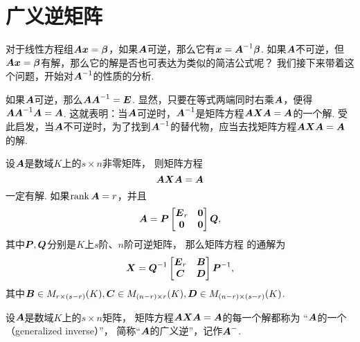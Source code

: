 \section{广义逆矩阵}
对于线性方程组\(\boldsymbol{A}\boldsymbol{x}=\boldsymbol\beta\)，如果\(\boldsymbol{A}\)可逆，那么它有\(\boldsymbol{x}=\boldsymbol{A}^{-1}\boldsymbol\beta\).
如果\(\boldsymbol{A}\)不可逆，但\(\boldsymbol{A}\boldsymbol{x}=\boldsymbol\beta\)有解，那么它的解是否也可表达为类似的简洁公式呢？
我们接下来带着这个问题，开始对\(\boldsymbol{A}^{-1}\)的性质的分析.

如果\(\boldsymbol{A}\)可逆，那么\(\boldsymbol{A}\boldsymbol{A}^{-1}=\boldsymbol{E}\).
显然，只要在等式两端同时右乘\(\boldsymbol{A}\)，便得\(\boldsymbol{A}\boldsymbol{A}^{-1}\boldsymbol{A}=\boldsymbol{A}\).
这就表明：当\(\boldsymbol{A}\)可逆时，\(\boldsymbol{A}^{-1}\)是矩阵方程\(\boldsymbol{A} \boldsymbol{X} \boldsymbol{A} = \boldsymbol{A}\)的一个解.
受此启发，当\(\boldsymbol{A}\)不可逆时，为了找到\(\boldsymbol{A}^{-1}\)的替代物，应当去找矩阵方程\(\boldsymbol{A} \boldsymbol{X} \boldsymbol{A} = \boldsymbol{A}\)的解.

\begin{theorem}[广义逆存在定理]\label{theorem:线性方程组.广义逆1}
设\(\boldsymbol{A}\)是数域\(K\)上的\(s \times n\)非零矩阵，
则矩阵方程\begin{equation}\label{equation:线性方程组.广义逆1矩阵方程}
	\boldsymbol{A} \boldsymbol{X} \boldsymbol{A} = \boldsymbol{A}
\end{equation}一定有解.
如果\(\rank\boldsymbol{A}=r\)，并且\begin{equation*}
	\boldsymbol{A}
	= \boldsymbol{P}
	\begin{bmatrix}
		\boldsymbol{E}_r & \boldsymbol0 \\
		\boldsymbol0 & \boldsymbol0
	\end{bmatrix}
	\boldsymbol{Q},
\end{equation*}
其中\(\boldsymbol{P},\boldsymbol{Q}\)分别是\(K\)上\(s\)阶、\(n\)阶可逆矩阵，
那么矩阵方程  的通解为
\begin{equation}\label{equation:线性方程组.广义逆1矩阵方程的通解}
	\boldsymbol{X} = \boldsymbol{Q}^{-1} \begin{bmatrix} \boldsymbol{E}_r & \boldsymbol{B} \\ \boldsymbol{C} & \boldsymbol{D} \end{bmatrix} \boldsymbol{P}^{-1},
\end{equation}
其中\(\boldsymbol{B}\in M_{r\times(s-r)}(K),
\boldsymbol{C}\in M_{(n-r)\times r}(K),
\boldsymbol{D}\in M_{(n-r)\times(s-r)}(K)\).
\end{theorem}

\begin{definition}
设\(\boldsymbol{A}\)是数域\(K\)上的\(s \times n\)矩阵，
矩阵方程\(\boldsymbol{A} \boldsymbol{X} \boldsymbol{A} = \boldsymbol{A}\)的每一个解都称为
“\(\boldsymbol{A}\)的一个（generalized inverse）”，
简称“\(\boldsymbol{A}\)的广义逆”，记作\(\boldsymbol{A}^-\).
\end{definition}

